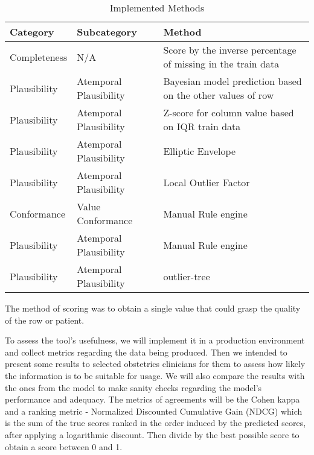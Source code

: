 \begin{table}[htpb]
\caption{Implemented Methods} \label{tab:methods}
\renewcommand{\arraystretch}{1.4}
\setlength{\tabcolsep}{10pt}

\begin{tabularx}{\textwidth}{ p{2cm} p{3.5cm} X }
\hline
 Category   & Subcategory           & Method   \\ \hline
Completeness     & N/A               & Score by the inverse percentage of missing in the train data         \\ 
Plausibility & Atemporal Plausibility & Bayesian model prediction based on the other values of row \\ 
Plausibility & Atemporal Plausibility         & Z-score for column value based on IQR train data       \\    
Plausibility & Atemporal Plausibility           & Elliptic Envelope                       \\ 
Plausibility & Atemporal Plausibility           & Local Outlier Factor                \\ 
Conformance & Value Conformance           & Manual Rule engine                           \\ 
Plausibility & Atemporal Plausibility           & Manual Rule engine                      \\ 
Plausibility & Atemporal Plausibility           & outlier-tree                      \\ 
\hline
\end{tabularx}

\end{table}
The method of scoring was to obtain a single value that could grasp the quality of the row or patient.


To assess the tool's usefulness, we will implement it in a production environment and collect metrics regarding the data being produced. Then we intended to present some results to selected obstetrics clinicians for them to assess how likely the information is to be suitable for usage. We will also compare the results with the ones from the model to make sanity checks regarding the model's performance and adequacy. The metrics of agreements will be the Cohen kappa and a ranking metric -  Normalized Discounted Cumulative Gain (NDCG) \cite{wangTheoreticalAnalysisNDCG} which is the sum of the true scores ranked in the order induced by the predicted scores, after applying a logarithmic discount. Then divide by the best possible score to obtain a score between 0 and 1.

